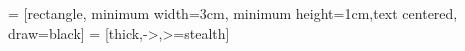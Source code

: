 \usepackage{tikz}
\usetikzlibrary{shapes.geometric, arrows}

 = [rectangle, minimum width=3cm, minimum height=1cm,text centered, draw=black]
 = [thick,->,>=stealth]

